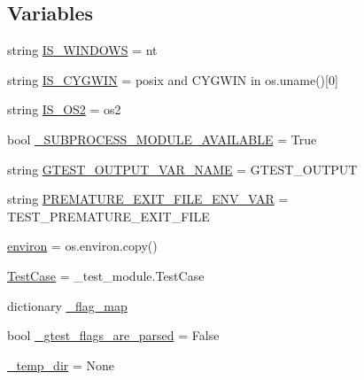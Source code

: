 \subsection*{Variables}
\begin{DoxyCompactItemize}
\item 
string \mbox{\hyperlink{namespacegtest__test__utils_a7555b17006f1c078cda336750b8613e0}{I\+S\+\_\+\+W\+I\+N\+D\+O\+WS}} = \textquotesingle{}nt\textquotesingle{}
\item 
string \mbox{\hyperlink{namespacegtest__test__utils_a6a936096debb3c2e807d000f76245740}{I\+S\+\_\+\+C\+Y\+G\+W\+IN}} = \textquotesingle{}posix\textquotesingle{} and \textquotesingle{}C\+Y\+G\+W\+IN\textquotesingle{} in os.\+uname()\mbox{[}0\mbox{]}
\item 
string \mbox{\hyperlink{namespacegtest__test__utils_a6f3472370693d96429867f227bccbd75}{I\+S\+\_\+\+O\+S2}} = \textquotesingle{}os2\textquotesingle{}
\item 
bool \mbox{\hyperlink{namespacegtest__test__utils_a530084b4f71f3cba76ea2d360fc9b245}{\+\_\+\+S\+U\+B\+P\+R\+O\+C\+E\+S\+S\+\_\+\+M\+O\+D\+U\+L\+E\+\_\+\+A\+V\+A\+I\+L\+A\+B\+LE}} = True
\item 
string \mbox{\hyperlink{namespacegtest__test__utils_aeb3755b4dd33aabe1baee781fecc1e66}{G\+T\+E\+S\+T\+\_\+\+O\+U\+T\+P\+U\+T\+\_\+\+V\+A\+R\+\_\+\+N\+A\+ME}} = \textquotesingle{}G\+T\+E\+S\+T\+\_\+\+O\+U\+T\+P\+UT\textquotesingle{}
\item 
string \mbox{\hyperlink{namespacegtest__test__utils_aa961c38a16224b2e7fd8c93fc1d2a90f}{P\+R\+E\+M\+A\+T\+U\+R\+E\+\_\+\+E\+X\+I\+T\+\_\+\+F\+I\+L\+E\+\_\+\+E\+N\+V\+\_\+\+V\+AR}} = \textquotesingle{}T\+E\+S\+T\+\_\+\+P\+R\+E\+M\+A\+T\+U\+R\+E\+\_\+\+E\+X\+I\+T\+\_\+\+F\+I\+LE\textquotesingle{}
\item 
\mbox{\hyperlink{namespacegtest__test__utils_ab0f2d4a3e90400abb93fd0808047a0a4}{environ}} = os.\+environ.\+copy()
\item 
\mbox{\hyperlink{namespacegtest__test__utils_acb97a85206c09d233db6c7f2362e5428}{Test\+Case}} = \+\_\+test\+\_\+module.\+Test\+Case
\item 
dictionary \mbox{\hyperlink{namespacegtest__test__utils_a2493ee5c4436cfb8b6746e3da0a5d9a1}{\+\_\+flag\+\_\+map}}
\item 
bool \mbox{\hyperlink{namespacegtest__test__utils_acdfe69fc5c1efd784fca3cc8a4f29429}{\+\_\+gtest\+\_\+flags\+\_\+are\+\_\+parsed}} = False
\item 
\mbox{\hyperlink{namespacegtest__test__utils_a63e521665d381cdeddd27066f11bdbbf}{\+\_\+temp\+\_\+dir}} = None
\end{DoxyCompactItemize}


